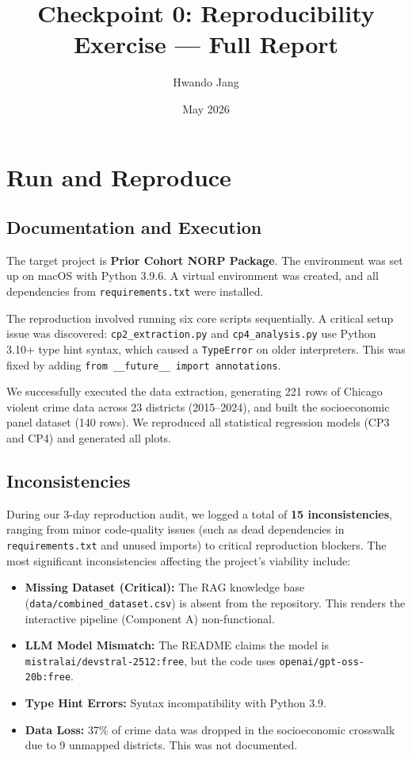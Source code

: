 \documentclass[12pt]{article}
\title{Checkpoint 0: Reproducibility Exercise --- Full Report}
\author{Hwando Jang}
\date{May 2026}
\begin{document}
\maketitle

\section{Run and Reproduce}
\subsection{Documentation and Execution}
The target project is \textbf{Prior Cohort NORP Package}. The environment was set up on macOS with Python 3.9.6. A virtual environment was created, and all dependencies from \texttt{requirements.txt} were installed.

The reproduction involved running six core scripts sequentially. A critical setup issue was discovered: \texttt{cp2\_extraction.py} and \texttt{cp4\_analysis.py} use Python 3.10+ type hint syntax, which caused a \texttt{TypeError} on older interpreters. This was fixed by adding \texttt{from \_\_future\_\_ import annotations}.

We successfully executed the data extraction, generating 221 rows of Chicago violent crime data across 23 districts (2015--2024), and built the socioeconomic panel dataset (140 rows). We reproduced all statistical regression models (CP3 and CP4) and generated all plots. 

\subsection{Inconsistencies}
During our 3-day reproduction audit, we logged a total of \textbf{15 inconsistencies}, ranging from minor code-quality issues (such as dead dependencies in \texttt{requirements.txt} and unused imports) to critical reproduction blockers. The most significant inconsistencies affecting the project's viability include:
\begin{itemize}
    \item \textbf{Missing Dataset (Critical):} The RAG knowledge base (\nolinkurl{data/combined_dataset.csv}) is absent from the repository. This renders the interactive pipeline (Component A) non-functional.
    \item \textbf{LLM Model Mismatch:} The README claims the model is \nolinkurl{mistralai/devstral-2512:free}, but the code uses \nolinkurl{openai/gpt-oss-20b:free}.
    \item \textbf{Type Hint Errors:} Syntax incompatibility with Python 3.9.
    \item \textbf{Data Loss:} 37\% of crime data was dropped in the socioeconomic crosswalk due to 9 unmapped districts. This was not documented.
\end{itemize}
\end{document}
